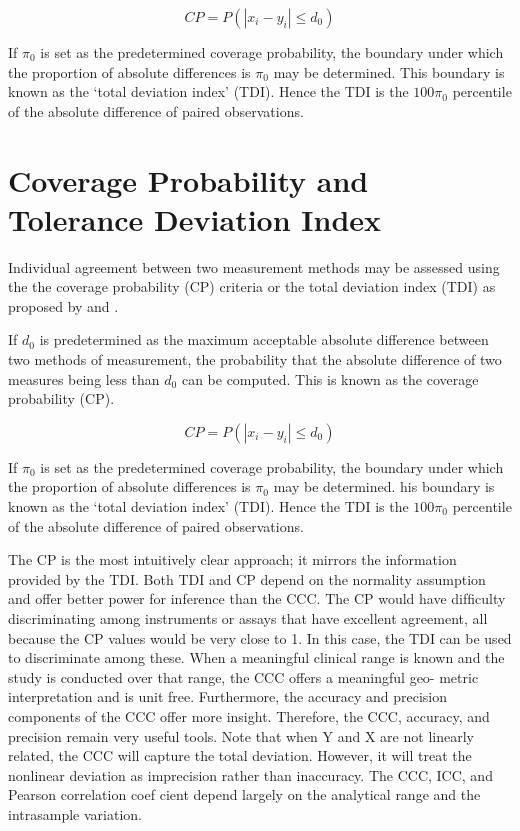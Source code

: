 \documentclass[MAIN.tex]{subfiles}
\begin{document}
	\begin{equation}
	CP = P(|x_{i} - y_{i}| \leq d_{0})
	\end{equation}
	
	If $\pi_{0}$ is set as the predetermined coverage probability, the
	boundary under which the proportion of absolute differences is
	$\pi_{0}$ may be determined. This boundary is known as the `total
	deviation index' (TDI). Hence the TDI is the $100\pi_{0}$
	percentile of the absolute difference of paired observations.
	
	
	
	\section{Coverage Probability and Tolerance Deviation Index}
	
	Individual agreement between two measurement methods may be
	assessed using the the coverage probability (CP) criteria or the
	total deviation index (TDI) as proposed by \citet{lin2000} and
	\citet{lin2002}.
	
	If $d_{0}$ is predetermined as the maximum acceptable absolute
	difference between two methods of measurement, the probability
	that the absolute difference of two measures being less than
	$d_{0}$ can be computed. This is known as the coverage probability
	(CP).
	
	\begin{equation}
	CP = P(|x_{i} - y_{i}| \leq d_{0})
	\end{equation}
	
	If $\pi_{0}$ is set as the predetermined coverage probability, the
	boundary under which the proportion of absolute differences is
	$\pi_{0}$ may be determined. his boundary is known as the `total
	deviation index' (TDI). Hence the TDI is the $100\pi_{0}$
	percentile of the absolute difference of paired observations.
	
	
	The CP is the most intuitively clear approach; it mirrors the information provided by the TDI. 
	Both TDI and CP depend on the normality assumption and offer better power
	for inference than the CCC. The CP would have difficulty discriminating among instruments or 
	assays that have excellent agreement, all because the CP values would be very close to
	1. In this case, the TDI can be used to discriminate among these. When a meaningful clinical range is known and the study is conducted over that range, the CCC offers a meaningful geo- metric interpretation and is unit free. Furthermore, the accuracy and precision components of the CCC offer more insight. Therefore, the CCC, accuracy, and precision remain very useful tools. Note that when Y and X are not linearly related, the CCC will capture the total deviation. However, it will treat the nonlinear deviation as imprecision rather than inaccuracy. The CCC, ICC, and Pearson correlation coef cient depend
	largely on the analytical range and the intrasample variation.
	
\end{document}
